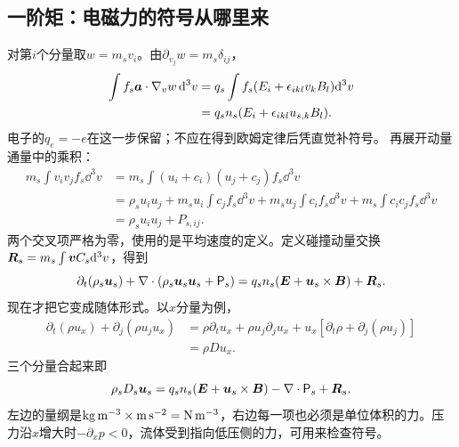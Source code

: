 \documentclass[UTF8,a4paper,11pt,openany,fontset=fandol]{ctexbook}
\begin{document}
\subsection{一阶矩：电磁力的符号从哪里来}
对第$i$个分量取$w=m_sv_i$。由$\partial_{v_j}w=m_s\delta_{ij}$，
\begin{align}
 \int f_s\bm{a}\cdot\nabla_vw\,\mathrm d^3v
 &=q_s\int f_s(E_i+\epsilon_{ikl}v_kB_l)\mathrm d^3v\\
 &=q_sn_s(E_i+\epsilon_{ikl}u_{s,k}B_l).
\end{align}
电子的$q_e=-e$在这一步保留；不应在得到欧姆定律后凭直觉补符号。
再展开动量通量中的乘积：
\begin{align}
 m_s\int v_iv_jf_s\dd^3v
 &=m_s\int(u_i+c_i)(u_j+c_j)f_s\dd^3v\\
 &=\rho_su_iu_j+
 m_su_i\int c_jf_s\dd^3v+
 m_su_j\int c_if_s\dd^3v+
 m_s\int c_ic_jf_s\dd^3v\\
 &=\rho_su_iu_j+P_{s,ij}.
\end{align}
两个交叉项严格为零，使用的是平均速度的定义。定义碰撞动量交换$\bm{R}_s=m_s\int\bm{v}C_s\mathrm d^3v$，得到
\begin{equation}
 \partial_t(\rho_s\bm{u}_s)+
 \nabla\cdot(\rho_s\bm{u}_s\bm{u}_s+\mathsf P_s)
 =q_sn_s(\bm{E}+\bm{u}_s\times\bm{B})+\bm{R}_s.
 \label{eq:momentum}
\end{equation}
现在才把它变成随体形式。以$x$分量为例，
\begin{align}
 \partial_t(\rho u_x)+\partial_j(\rho u_ju_x)
 &=\rho\partial_tu_x+\rho u_j\partial_ju_x
   +u_x[\partial_t\rho+\partial_j(\rho u_j)]\\
 &=\rho Du_x.
\end{align}
三个分量合起来即
\begin{equation}
 \rho_sD_s\bm{u}_s=q_sn_s(\bm{E}+\bm{u}_s\times\bm{B})
                  -\nabla\cdot\mathsf P_s+\bm{R}_s.
 \label{eq:speciesmom}
\end{equation}
左边的量纲是$ {\rm kg\,m^{-3}}\times{\rm m\,s^{-2}}={\rm N\,m^{-3}}$，右边每一项也必须是单位体积的力。压力沿$x$增大时$-\partial_xp<0$，流体受到指向低压侧的力，可用来检查符号。
\end{document}
